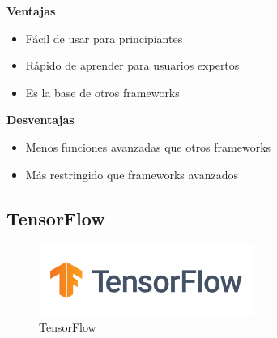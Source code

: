 

\begin{minipage}[t]{0.45\textwidth}
    \centering
    \textbf{Ventajas} \\[1ex]
    \begin{itemize}
        \item Fácil de usar para principiantes
        \item Rápido de aprender para usuarios expertos
        \item Es la base de otros frameworks
    \end{itemize}
\end{minipage}%
\hfill
\begin{minipage}[t]{0.45\textwidth}
    \centering
    \textbf{Desventajas} \\[1ex]
    \begin{itemize}
        \item Menos funciones avanzadas que otros frameworks
        \item Más restringido que frameworks avanzados
    \end{itemize}
\end{minipage}

\subsection{TensorFlow}

\begin{figure}[H]
    \centering
    \includegraphics[width=7cm]{figures/assets/Logo_TensorFlow.png}
    \caption{TensorFlow}
    \label{fig:lib-tensorflow}
\end{figure}

